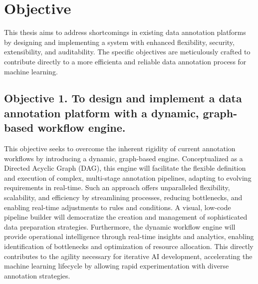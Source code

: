 \section{Objective}
\label{sec:chapter-1-objectives}

This thesis aims to address shortcomings in existing data annotation platforms by designing and implementing a system with enhanced flexibility, security, extensibility, and auditability. The specific objectives are meticulously crafted to contribute directly to a more efficienta and reliable data annotation process for machine learning.

\subsection*{Objective 1. To design and implement a data annotation platform with a dynamic, graph-based workflow engine.}
This objective seeks to overcome the inherent rigidity of current annotation workflows by introducing a dynamic, graph-based engine. Conceptualized as a Directed Acyclic Graph (DAG), this engine will facilitate the flexible definition and execution of complex, multi-stage annotation pipelines, adapting to evolving requirements in real-time. Such an approach offers unparalleled flexibility, scalability, and efficiency by streamlining processes, reducing bottlenecks, and enabling real-time adjustments to rules and conditions. A visual, low-code pipeline builder will democratize the creation and management of sophisticated data preparation strategies. Furthermore, the dynamic workflow engine will provide operational intelligence through real-time insights and analytics, enabling identification of bottlenecks and optimization of resource allocation. This directly contributes to the agility necessary for iterative AI development, accelerating the machine learning lifecycle by allowing rapid experimentation with diverse annotation strategies.

